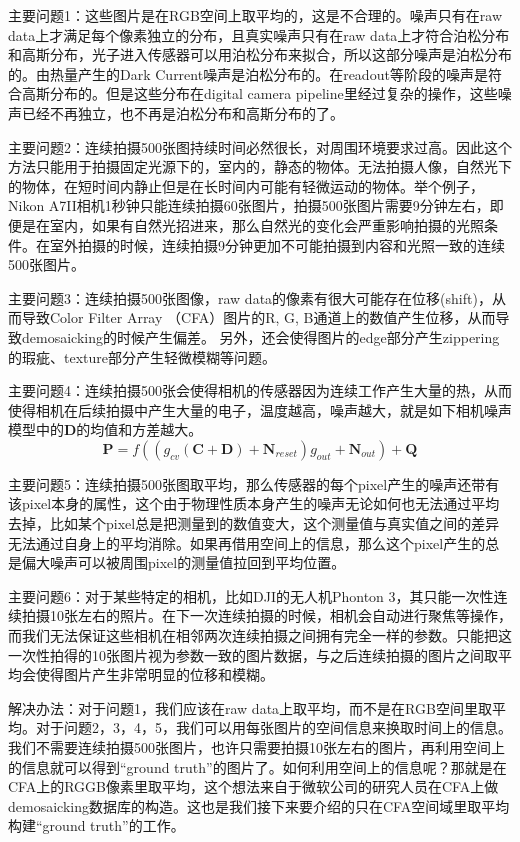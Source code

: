 \documentclass[10pt,twocolumn,letterpaper]{article}
\begin{document}
主要问题1：这些图片是在RGB空间上取平均的，这是不合理的。噪声只有在raw data上才满足每个像素独立的分布，且真实噪声只有在raw data上才符合泊松分布和高斯分布，光子进入传感器可以用泊松分布来拟合，所以这部分噪声是泊松分布的。由热量产生的Dark Current噪声是泊松分布的。在readout等阶段的噪声是符合高斯分布的。但是这些分布在digital camera pipeline里经过复杂的操作，这些噪声已经不再独立，也不再是泊松分布和高斯分布的了。

主要问题2：连续拍摄500张图持续时间必然很长，对周围环境要求过高。因此这个方法只能用于拍摄固定光源下的，室内的，静态的物体。无法拍摄人像，自然光下的物体，在短时间内静止但是在长时间内可能有轻微运动的物体。举个例子，Nikon A7II相机1秒钟只能连续拍摄60张图片，拍摄500张图片需要9分钟左右，即便是在室内，如果有自然光招进来，那么自然光的变化会严重影响拍摄的光照条件。在室外拍摄的时候，连续拍摄9分钟更加不可能拍摄到内容和光照一致的连续500张图片。

主要问题3：连续拍摄500张图像，raw data的像素有很大可能存在位移(shift)，从而导致Color Filter Array （CFA）图片的R, G, B通道上的数值产生位移，从而导致demosaicking的时候产生偏差。 另外，还会使得图片的edge部分产生zippering的瑕疵、texture部分产生轻微模糊等问题。

主要问题4：连续拍摄500张会使得相机的传感器因为连续工作产生大量的热，从而使得相机在后续拍摄中产生大量的电子，温度越高，噪声越大，就是如下相机噪声模型中的$\bm{D}$的均值和方差越大。
\begin{equation}
\bm{P} = f((g_{cv}(\bm{C}+\bm{D})+\bm{N}_{reset})g_{out}+\bm{N}_{out})+\bm{Q}
\end{equation}

主要问题5：连续拍摄500张图取平均，那么传感器的每个pixel产生的噪声还带有该pixel本身的属性，这个由于物理性质本身产生的噪声无论如何也无法通过平均去掉，比如某个pixel总是把测量到的数值变大，这个测量值与真实值之间的差异无法通过自身上的平均消除。如果再借用空间上的信息，那么这个pixel产生的总是偏大噪声可以被周围pixel的测量值拉回到平均位置。


主要问题6：对于某些特定的相机，比如DJI的无人机Phonton 3，其只能一次性连续拍摄10张左右的照片。在下一次连续拍摄的时候，相机会自动进行聚焦等操作，而我们无法保证这些相机在相邻两次连续拍摄之间拥有完全一样的参数。只能把这一次性拍得的10张图片视为参数一致的图片数据，与之后连续拍摄的图片之间取平均会使得图片产生非常明显的位移和模糊。


解决办法：对于问题1，我们应该在raw data上取平均，而不是在RGB空间里取平均。对于问题2，3，4，5，我们可以用每张图片的空间信息来换取时间上的信息。我们不需要连续拍摄500张图片，也许只需要拍摄10张左右的图片，再利用空间上的信息就可以得到``ground truth''的图片了。如何利用空间上的信息呢？那就是在CFA上的RGGB像素里取平均，这个想法来自于微软公司的研究人员在CFA上做demosaicking数据库的构造\cite{khashabi2014joint}。这也是我们接下来要介绍的只在CFA空间域里取平均构建``ground truth''的工作。
\end{document}
